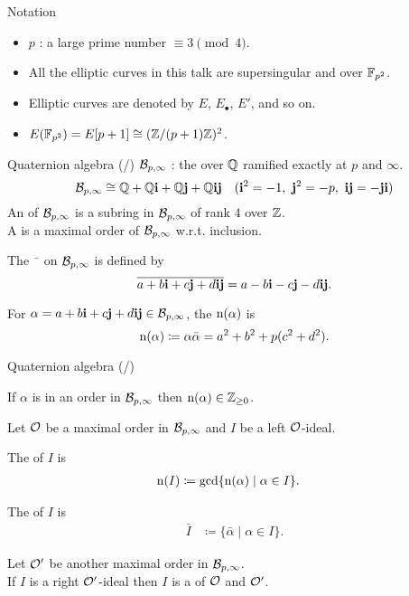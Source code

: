 
\begin{frame}{Notation}

    \begin{itemize}
        \setlength{\itemsep}{10pt}
        \item $p$ : a large prime number $\equiv 3 \pmod{4}$.
        \item All the elliptic curves in this talk are supersingular and over $\mathbb{F}_{p^2}$.
        \item Elliptic curves are denoted by $E$, $E_\bullet$, $E'$, and so on.
        \item $E(\mathbb{F}_{p^2}) = E[p+1] \cong (\mathbb{Z}/(p+1)\mathbb{Z})^2$.
    \end{itemize}

\end{frame}

\newcommand*{\quatotal}{\total{cnt_quat}}
\begin{frame}{Quaternion algebra (/\quatotal{})}
    $\mathcal{B}_{p,\infty}$ : the  over $\mathbb{Q}$ ramified exactly at $p$ and $\infty$.
    $$\mathcal{B}_{p,\infty} \cong \mathbb{Q} + \mathbb{Q}\mathbf{i} + \mathbb{Q}\mathbf{j} + \mathbb{Q}\mathbf{i}\mathbf{j} \quad (\mathbf{i}^2 = -1,\ \mathbf{j}^2 = -p,\ \mathbf{i}\mathbf{j} = -\mathbf{j}\mathbf{i})$$
    An  of $\mathcal{B}_{p,\infty}$ is a subring in $\mathcal{B}_{p,\infty}$ of rank $4$ over $\mathbb{Z}$.\\[5pt]
    A  is a maximal order of $\mathcal{B}_{p,\infty}$ w.r.t. inclusion.

    \vspace{10pt}
    The  $\bar{\phantom{a}}$ on $\mathcal{B}_{p,\infty}$ is defined by
    $$\overline{a + b\mathbf{i} + c\mathbf{j} + d\mathbf{i}\mathbf{j}} = a - b\mathbf{i} - c\mathbf{j} - d\mathbf{i}\mathbf{j}.$$

    For $\alpha = a + b\mathbf{i} + c\mathbf{j} + d\mathbf{i}\mathbf{j} \in \mathcal{B}_{p,\infty}$,
    the  $\mathrm{n}(\alpha)$ is
    $$\mathrm{n}(\alpha) \coloneqq \alpha\bar{\alpha} = a^2 + b^2 + p(c^2 + d^2).$$
\end{frame}

\begin{frame}{Quaternion algebra (/\quatotal{})}
    \begin{lemma}
        If $\alpha$ is in an order in $\mathcal{B}_{p,\infty}$ then $\mathrm{n}(\alpha) \in \mathbb{Z}_{\geq 0}$.
    \end{lemma}

    \vspace{10pt}
    Let $\mathcal{O}$ be a maximal order in $\mathcal{B}_{p,\infty}$
    and $I$ be a left $\mathcal{O}$-ideal.

    The  of $I$ is
    \begin{align*}
        \mathrm{n}(I) &\coloneqq \gcd\{\mathrm{n}(\alpha) \mid \alpha \in I\}.
    \end{align*}

    The  of $I$ is
    \begin{align*}
        \bar{I} &\coloneqq \{\bar{\alpha} \mid \alpha \in I\}.
    \end{align*}

    Let $\mathcal{O}'$ be another maximal order in $\mathcal{B}_{p,\infty}$.\\
    If $I$ is a right $\mathcal{O}'$-ideal then $I$ is a  of $\mathcal{O}$ and $\mathcal{O}'$.
\end{frame}

